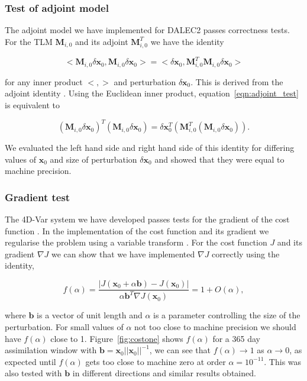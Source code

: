 \documentclass[review]{elsarticle}
\begin{document}
\subsubsection{Test of adjoint model} 

The adjoint model we have implemented for DALEC2 passes correctness tests. For the TLM $\mathbf{M}_{i,0}$ and its adjoint $\mathbf{M}_{i,0}^{T}$ we have the identity
\begin{linenomath}
\begin{equation}
<\mathbf{M}_{i,0}\delta\textbf{x}_0, \mathbf{M}_{i,0}\delta\textbf{x}_0> = <\delta\textbf{x}_0, \mathbf{M}_{i,0}^{T}\mathbf{M}_{i,0}\delta\textbf{x}_0> \label{eqn:adjoint_test}
\end{equation}
\end{linenomath}
for any inner product $<, >$ and perturbation $\delta \textbf{x}_0$. This is derived from the adjoint identity \citep{lawless2013}. Using the Euclidean inner product, equation~\eqref{eqn:adjoint_test} is equivalent to
\begin{linenomath}
\begin{equation}
(\mathbf{M}_{i,0}\delta\textbf{x}_0)^{T} (\mathbf{M}_{i,0}\delta\textbf{x}_0) = \delta\textbf{x}_0^{T} (\mathbf{M}_{i,0}^{T}(\mathbf{M}_{i,0}\delta\textbf{x}_0)).
\end{equation}
\end{linenomath}
We evaluated the left hand side and right hand side of this identity for differing values of $\textbf{x}_0$ and size of perturbation $\delta \textbf{x}_0$ and showed that they were equal to machine precision.

\subsubsection{Gradient test} \label{sec:testgrad}

The 4D-Var system we have developed passes tests for the gradient of the cost function \citep{Navon1992}. In the implementation of the cost function and its gradient we regularise the problem using a variable transform \citep{Freitag2010}. For the cost function $J$ and its gradient $\nabla J$ we can show that we have implemented $\nabla J$ correctly using the identity,
\begin{linenomath}
\begin{equation}
f(\alpha)=\frac{| J( \textbf{x}_0 + \alpha \textbf{b}) - J(\textbf{x}_0) |}{\alpha \textbf{b}^{T} \nabla J(\textbf{x}_0)} = 1 + O(\alpha),
\end{equation}
\end{linenomath}
where $\textbf{b}$ is a vector of unit length and $\alpha$ is a parameter controlling the size of the perturbation. For small values of $\alpha$ not too close to machine precision we should have $f(\alpha)$ close to 1. Figure~\ref{fig:costone} shows $f(\alpha)$ for a 365 day assimilation window with $\textbf{b}=\textbf{x}_0||\textbf{x}_0||^{-1}$, we can see that $f(\alpha) \rightarrow 1$ as $\alpha \rightarrow 0$, as expected until $f(\alpha)$ gets too close to machine zero at order $\alpha = 10^{-11}$. This was also tested with $\textbf{b}$ in different directions and similar results obtained.
\end{document}
